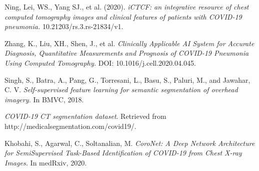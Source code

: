 \begin{thebibliography}{1}
	 Ning, Lei, WS., Yang SJ., et al. (2020). \textit{iCTCF: an integrative resource of chest computed tomography images and clinical features of patients with COVID-19 pneumonia.} 10.21203/rs.3.rs-21834/v1.

	 Zhang, K., Liu, XH., Shen, J., et al. \textit{Clinically Applicable AI System for Accurate Diagnosis, Quantitative Measurements and Prognosis of COVID-19 Pneumonia Using Computed Tomography.} DOI: 10.1016/j.cell.2020.04.045.
	
	  Singh, S., Batra, A., Pang, G., Torresani, L., Basu, S.,  Paluri, M., and Jawahar, C. V.  \textit{Self-supervised feature learning for semantic segmentation of
	overhead imagery.} In BMVC, 2018.

	 \textit{COVID-19 CT segmentation dataset}. Retrieved from http://medicalsegmentation.com/covid19/.
	
	 Khobahi, S., Agarwal, C., Soltanalian, M. \textit{CoroNet: A Deep Network Architecture for
		SemiSupervised Task-Based Identification of COVID-19 from Chest X-ray Images.} In medRxiv, 2020.

\end{thebibliography}

